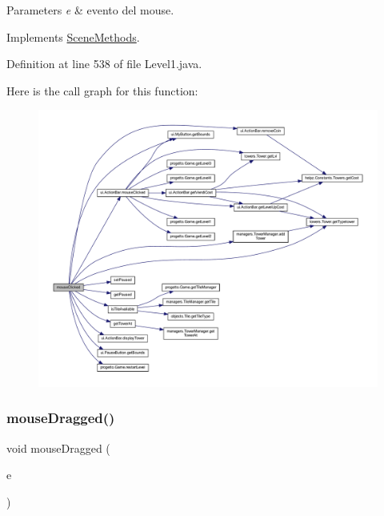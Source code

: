 \begin{DoxyParams}{Parameters}
{\em e} & evento del mouse. \\
\hline
\end{DoxyParams}


Implements \hyperlink{interfacescenes_1_1_scene_methods_a45d56bd84238e8b56589dfc732e2b2cf}{Scene\+Methods}.



Definition at line 538 of file Level1.\+java.

Here is the call graph for this function\+:
\nopagebreak
\begin{figure}[H]
\begin{center}
\leavevmode
\includegraphics[width=350pt]{classscenes_1_1_level1_a45d56bd84238e8b56589dfc732e2b2cf_cgraph}
\end{center}
\end{figure}
\mbox{\label{classscenes_1_1_level1_adbfc0588c017133c9b7070474402b72f}} 
\subsubsection{\texorpdfstring{mouse\+Dragged()}{mouseDragged()}}
{\footnotesize\ttfamily void mouse\+Dragged (\begin{DoxyParamCaption}\item[{Mouse\+Event}]{e }\end{DoxyParamCaption})}



